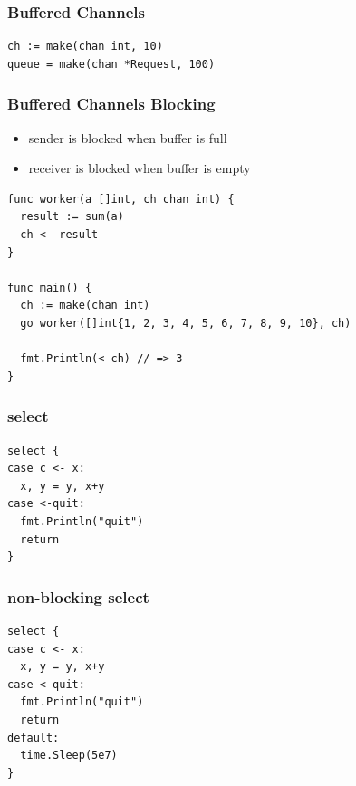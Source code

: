 \documentclass[xetex,mathserif,serif,12pt]{beamer}
\begin{document}
\begin{frame}[fragile]
  \frametitle{Buffered Channels}
  \begin{beamer@nomargin}
    \begin{lstlisting}
ch := make(chan int, 10)
queue = make(chan *Request, 100)
    \end{lstlisting}
  \end{beamer@nomargin}
\end{frame}

\begin{frame}
  \frametitle{Buffered Channels Blocking}

  \begin{itemize}
  \item sender is blocked when buffer is full
  \item receiver is blocked when buffer is empty
  \end{itemize}
\end{frame}

\begin{frame}[fragile]
  \begin{beamer@nomargin}
    \begin{lstlisting}
func worker(a []int, ch chan int) {
  result := sum(a)
  ch <- result
}

func main() {
  ch := make(chan int)
  go worker([]int{1, 2, 3, 4, 5, 6, 7, 8, 9, 10}, ch)

  fmt.Println(<-ch) // => 3
}
    \end{lstlisting}
  \end{beamer@nomargin}
\end{frame}

\begin{frame}[fragile]
  \frametitle{\ttfamily select}

  \begin{beamer@nomargin}
    \begin{lstlisting}
select {
case c <- x:
  x, y = y, x+y
case <-quit:
  fmt.Println("quit")
  return
}
    \end{lstlisting}
  \end{beamer@nomargin}
\end{frame}

\begin{frame}[fragile]
  \frametitle{non-blocking {\ttfamily select}}

  \begin{beamer@nomargin}
    \begin{lstlisting}
select {
case c <- x:
  x, y = y, x+y
case <-quit:
  fmt.Println("quit")
  return
default:
  time.Sleep(5e7)
}
    \end{lstlisting}
  \end{beamer@nomargin}
\end{frame}
\end{document}
